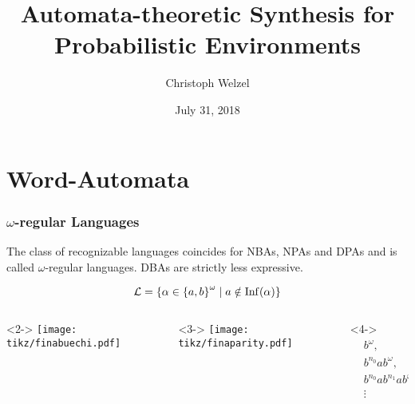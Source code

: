 \documentclass{beamer}
\title[Syn. for prob. Env.]{
  Automata-theoretic Synthesis for Probabilistic Environments}
\date{July 31, 2018}
\author{Christoph Welzel}
\institute{Informatik 7, RWTH Aachen}
\begin{document}
  \acuseall

  \maketitle

  \section{Word-Automata}
  \begin{frame}
    \frametitle{$\omega$-regular Languages}
    \begin{theorem}
      The class of recognizable languages coincides for \alert<2>{\acp{NBA}},
      \alert<3>{\acp{NPA} and \acp{DPA}} and is called $\omega$-regular
      languages. \alert<4>{\acp{DBA} are strictly less expressive.}
    \end{theorem}
    \begin{overlayarea}{\textwidth}{0.5\textheight}
        \begin{equation*}
          \mathcal{L} = \left\{
            \alpha\in\left\{a,b\right\}^{\omega}\mid a\notin\operatorname{Inf}(\alpha)
          \right\}
        \end{equation*}
        \begin{columns}
          \begin{column}{0.3\textwidth}<2->
            \texttt{[image: tikz/finabuechi.pdf]}
          \end{column}
          \begin{column}{0.3\textwidth}<3->
            \texttt{[image: tikz/finaparity.pdf]}
          \end{column}
          \begin{column}{0.3\textwidth}<4->
            \begin{align*}
              &b^{\omega},\\
              &b^{n_{0}}ab^{\omega},\\
              &b^{n_{0}}ab^{n_{1}}ab^{\omega},\\
              &\vdots
            \end{align*}
          \end{column}
        \end{columns}
    \end{overlayarea}
  \end{frame}
\end{document}
